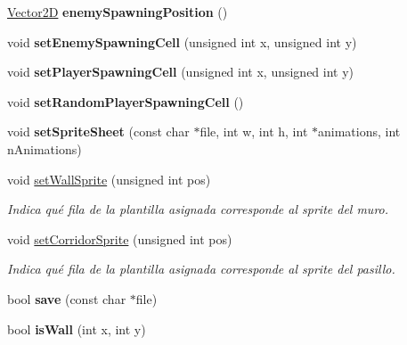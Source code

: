 \begin{DoxyCompactItemize}
\item 
\hypertarget{class_scenario_a2415ebf67ac30ed8a32f074a07b16904}{\hyperlink{class_vector2_d}{Vector2\-D} {\bfseries enemy\-Spawning\-Position} ()}\label{class_scenario_a2415ebf67ac30ed8a32f074a07b16904}

\item 
\hypertarget{class_scenario_a6b4df480c24ac6e608b0db70213d1756}{void {\bfseries set\-Enemy\-Spawning\-Cell} (unsigned int x, unsigned int y)}\label{class_scenario_a6b4df480c24ac6e608b0db70213d1756}

\item 
\hypertarget{class_scenario_a696289efceb56b7e53b9ebd657b69c3e}{void {\bfseries set\-Player\-Spawning\-Cell} (unsigned int x, unsigned int y)}\label{class_scenario_a696289efceb56b7e53b9ebd657b69c3e}

\item 
\hypertarget{class_scenario_a75e4afed8ae12a12fbf822d2a23aebf4}{void {\bfseries set\-Random\-Player\-Spawning\-Cell} ()}\label{class_scenario_a75e4afed8ae12a12fbf822d2a23aebf4}

\item 
\hypertarget{class_scenario_a3d9f5b2d8f7fe2ff636c4d9d7b96caa7}{void {\bfseries set\-Sprite\-Sheet} (const char $\ast$file, int w, int h, int $\ast$animations, int n\-Animations)}\label{class_scenario_a3d9f5b2d8f7fe2ff636c4d9d7b96caa7}

\item 
void \hyperlink{class_scenario_a264bcbcfb4cf26c79fcd0bb92e6a6991}{set\-Wall\-Sprite} (unsigned int pos)
\begin{DoxyCompactList}\small\item\em Indica qué fila de la plantilla asignada corresponde al sprite del muro. \end{DoxyCompactList}\item 
void \hyperlink{class_scenario_a5a16a90c0b3bbccc8b79316a159631ec}{set\-Corridor\-Sprite} (unsigned int pos)
\begin{DoxyCompactList}\small\item\em Indica qué fila de la plantilla asignada corresponde al sprite del pasillo. \end{DoxyCompactList}\item 
\hypertarget{class_scenario_abc3b44c28bf74a91f9e7a052f8010269}{bool {\bfseries save} (const char $\ast$file)}\label{class_scenario_abc3b44c28bf74a91f9e7a052f8010269}

\item 
\hypertarget{class_scenario_ab0df7d43602535a535b30db82115c912}{bool {\bfseries is\-Wall} (int x, int y)}\label{class_scenario_ab0df7d43602535a535b30db82115c912}


\end{DoxyCompactItemize}
